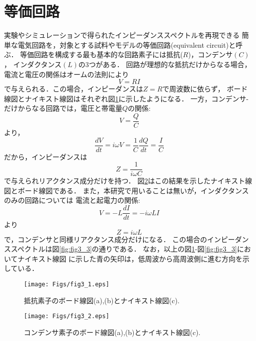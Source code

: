 \section{等価回路}
実験やシミュレーションで得られたインピーダンススペクトルを再現できる
簡単な電気回路を，対象とする試料やモデルの等価回路(equivalent circuit)と呼ぶ．
等価回路を構成する最も基本的な回路素子には抵抗($R$)，コンデンサ$(C)$，
インダクタンス$(L)$の3つがある．
回路が理想的な抵抗だけからなる場合，電流と電圧の関係はオームの法則により
\begin{equation}
	V=RI
	\label{eqn:Ohom}
\end{equation}
で与えられる．この場合，インピーダンスは$Z=R$で周波数に依らず，
ボード線図とナイキスト線図はそれぞれ図\ref{fig:fig3_1}に示したようになる．
一方，コンデンサ-だけからなる回路では，電圧と帯電量$Q$の関係:
\begin{equation}
	V=\frac{Q}{C}
	\label{eqn:Q_CV}
\end{equation}
より，
\begin{equation}
	\frac{dV}{dt}=i\omega V =\frac{1}{C}\frac{dQ}{dt}=\frac{I}{C}
	\label{eqn:}
\end{equation}
だから，インピーダンスは
\begin{equation}
	Z=\frac{1}{i\omega C}
	\label{eqn:Zc}
\end{equation}
で与えられリアクタンス成分だけを持つ．
図\ref{fig:fig3_2}はこの結果を示したナイキスト線図とボード線図である．
また，本研究で用いることは無いが，インダクタンスのみの回路については
電流と起電力の関係:
\begin{equation}
	V=-L\frac{dI}{dt}=-i\omega LI 
	\label{eqn:}
\end{equation}
より
\begin{equation}
	Z=i\omega L
	\label{eqn:}
\end{equation}
で，コンデンサと同様リアクタンス成分だけになる．
この場合のインピーダンススペクトルは図\ref{fig:fig3_3}の通りである．
なお，以上の図\ref{fig:fig3_1}-図\ref{fig:fig3_3}においてナイキスト線図
に示した青の矢印は，低周波から高周波側に進む方向を示している．
\begin{figure}[h]
	\begin{center}
	\texttt{[image: Figs/fig3\_1.eps]} 
	\end{center}
	\caption{
		抵抗素子のボード線図(a),(b)とナイキスト線図(c).
	} 
	\label{fig:fig3_1}
\end{figure}
\begin{figure}[h]
	\begin{center}
	\texttt{[image: Figs/fig3\_2.eps]} 
	\end{center}
	\caption{
		コンデンサ素子のボード線図(a),(b)とナイキスト線図(c).
	} 
	\label{fig:fig3_2}
\end{figure}
